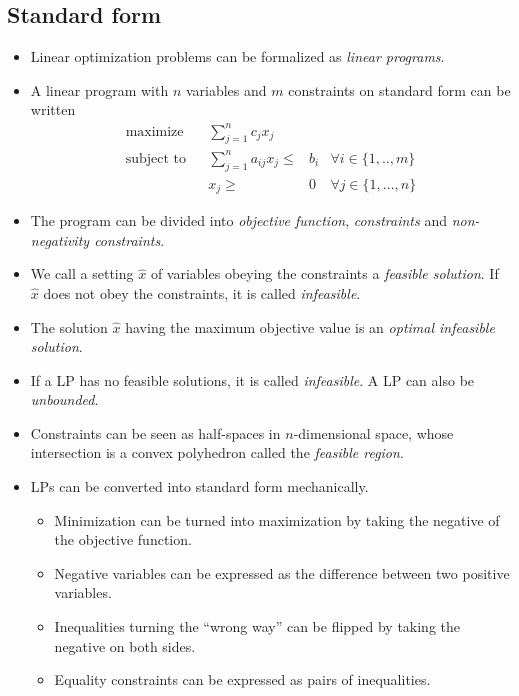 \subsection{Standard form}
\begin{itemize}
\item Linear optimization problems can be formalized as \emph{linear
    programs}.

\item A linear program with $n$ variables and $m$ constraints on
  standard form can be written
\begin{align*}
  \text{maximize} && \sum_{j=1}^n c_j x_j \\
  \text{subject to} && \sum_{j=1}^n a_{ij}x_j \leq{}& b_i & \forall i \in \{1,..,m\} \\
   && x_j \geq{}& 0 & \forall j \in \{1,...,n\}
\end{align*}

\item The program can be divided into \emph{objective function},
  \emph{constraints} and \emph{non-negativity constraints}.

\item We call a setting $\hat x$ of variables obeying the constraints
  a \emph{feasible solution}. If $\hat x$ does not obey the
  constraints, it is called \emph{infeasible}.

\item The solution $\hat x$ having the maximum objective value is an
  \emph{optimal infeasible solution}.

\item If a LP has no feasible solutions, it is called
  \emph{infeasible}. A LP can also be \emph{unbounded}.

\item Constraints can be seen as half-spaces in $n$-dimensional space,
  whose intersection is a convex polyhedron called the \emph{feasible
    region}.

\item LPs can be converted into standard form mechanically.
  \begin{itemize}
  \item Minimization can be turned into maximization by taking the
    negative of the objective function.
  \item Negative variables can be expressed as the difference between
    two positive variables.
  \item Inequalities turning the ``wrong way'' can be flipped by
    taking the negative on both sides.
  \item Equality constraints can be expressed as pairs of
    inequalities.
  \end{itemize}
\end{itemize}

